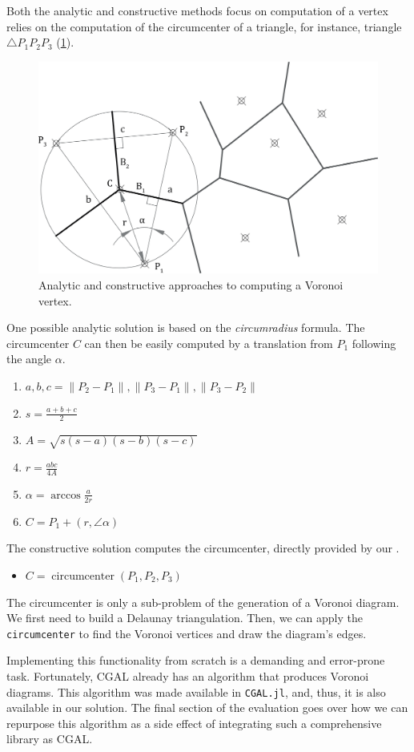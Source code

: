 Both the analytic and constructive methods focus on computation of a vertex
relies on the computation of the circumcenter of a triangle, for instance,
triangle $\triangle P_1 P_2 P_3$ (\cref{fig:eval.studies.voronoi.sol}).

\begin{figure}[htb]
  \centering
  \includegraphics[width=.7\linewidth]{fig/voronoi-solution}
  \caption{\label{fig:eval.studies.voronoi.sol}
    Analytic and constructive approaches to computing a Voronoi vertex.}%
\end{figure}

One possible analytic solution is based on the \textit{circumradius} formula.
The circumcenter $C$ can then be easily computed by a translation from $P_1$
following the angle $\alpha$.

\begin{enumerate}
  \item $a, b, c = \lVert P_2 - P_1 \rVert, \lVert P_3 - P_1 \rVert, \lVert P_3
  - P_2 \rVert$
  \item $s = \frac{a + b + c}{2}$
  \item $A = \sqrt{s(s - a)(s - b)(s - c)}$
  \item $r = \frac{abc}{4A}$
  \item $\alpha = \arccos\frac{a}{2r}$
  \item $C = P_1 + \left(r, \angle\alpha\right)$
\end{enumerate}

The constructive solution computes the circumcenter, directly provided by our
\primitives{}.

\begin{itemize}
  \item[] $C = \operatorname{circumcenter}\left(P_1, P_2, P_3\right)$
\end{itemize}

The circumcenter is only a sub-problem of the generation of a Voronoi diagram.
We first need to build a Delaunay triangulation.  Then, we can apply the
\texttt{circumcenter} to find the Voronoi vertices and draw the diagram's edges.

Implementing this functionality from scratch is a demanding and error-prone
task.  Fortunately, \ac{CGAL} already has an algorithm that produces Voronoi
diagrams.  This algorithm was made available in \texttt{CGAL.jl},
and, thus, it is also available in our solution.  The final section of the
evaluation goes over how we can repurpose this algorithm as a side effect of
integrating such a comprehensive library as \ac{CGAL}.
